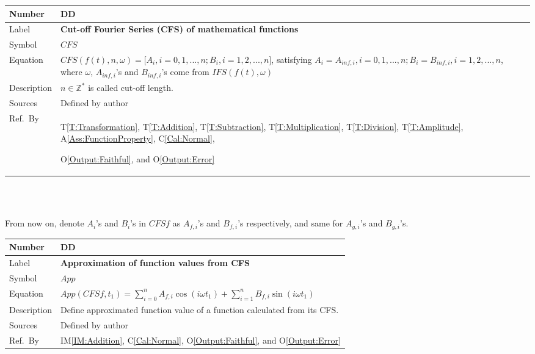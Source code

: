 \documentclass[12pt]{article}
\newcommand{\colAwidth}{0.13\textwidth}
\newcommand{\colBwidth}{0.82\textwidth}
\newcounter{defnum} %
\newcounter{datadefnum} %
\newcommand{\tref}[1]{T\ref{#1}}
\newcommand{\aref}[1]{A\ref{#1}}
\newcommand{\calref}[1]{C\ref{#1}}
\newcommand{\oref}[1]{O\ref{#1}}
\newcommand{\iref}[1]{IM\ref{#1}}
\begin{document}
\noindent
\begin{minipage}{\textwidth}
	\renewcommand*{\arraystretch}{1.5}
	\begin{tabular}{| p{\colAwidth} | p{\colBwidth}|}
		\hline
		\rowcolor[gray]{0.9}
		Number& DD{datadefnum}\thedatadefnum \label{DD:CFS}\\
		\hline
		Label& \bf Cut-off Fourier Series (CFS) of mathematical functions\\
		\hline
		Symbol &$\mathit{CFS}$\\
		\hline
		Equation&$\mathit{CFS}(f(t), n, \omega)=\big[A_i, i=0, 1, ..., n; 
		B_i, i=1, 2, ..., n\big]$, satisfying $A_i=A_{inf, i}, i=0, 1, ..., n; 
		B_i=B_{inf, i}, i=1, 2, ..., n$, where 
		$\omega$, $A_{inf, i}$'s 
		and $B_{inf, i}$'s come from $\mathit{IFS}(f(t), \omega)$ \\
		\hline
		Description & $n\in \mathbb{Z}^{*}$ is called cut-off length.\\
		\hline
		Sources& Defined by author\\
		\hline
		Ref.\ By & \tref{T:Transformation}, \tref{T:Addition}, 
		\tref{T:Subtraction}, \tref{T:Multiplication}, 
		\tref{T:Division}, \tref{T:Amplitude}, 
		\aref{Ass:FunctionProperty},  \calref{Cal:Normal}, 
		
		\oref{Output:Faithful}, and \oref{Output:Error}\\
		\hline
	\end{tabular}
\end{minipage}\\
~\newline

From now on, denote $A_i$'s and $B_i$'s in $\mathit{CFSf}$ 
as $A_{f, i}$'s and $B_{f, i}$'s respectively, and same for 
$A_{g, i}$'s and $B_{g, i}$'s.
~\newline

\noindent
\begin{minipage}{\textwidth}
	\renewcommand*{\arraystretch}{1.5}
	\begin{tabular}{| p{\colAwidth} | p{\colBwidth}|}
		\hline
		\rowcolor[gray]{0.9}
		Number& DD{datadefnum}\thedatadefnum 
		\label{DD:Approximation}\\
		\hline
		Label& \bf Approximation of function values from CFS\\
		\hline
		Symbol &$\mathit{App}$\\
		\hline
		Equation& $\mathit{App}(\mathit{CFSf}, t_1)=\sum_{i=0}^{n}A_{f,i}\cos(i\omega t_1)+
		\sum_{i=1}^{n}B_{f,i}\sin(i\omega t_1)$ \\
		\hline
		Description & Define approximated function value of a function 
		calculated from its CFS.\\
		\hline
		Sources& Defined by author\\
		\hline
		Ref.\ By & \iref{IM:Addition}, \calref{Cal:Normal}, 
		\oref{Output:Faithful}, and \oref{Output:Error}\\
		\hline
	\end{tabular}
\end{minipage}\\
~\newline
\end{document}
